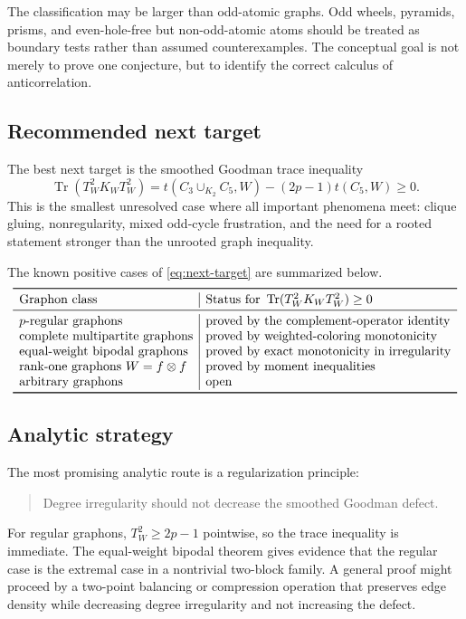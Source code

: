 \documentclass[11pt]{article}
\theoremstyle{definition}
\newcommand{\Tr}{\operatorname{Tr}}
\begin{document}
The classification may be larger than odd-atomic graphs.  Odd wheels, pyramids, prisms, and even-hole-free but non-odd-atomic atoms should be treated as boundary tests rather than assumed counterexamples.  The conceptual goal is not merely to prove one conjecture, but to identify the correct calculus of anticorrelation.

\subsection{Recommended next target}

The best next target is the smoothed Goodman trace inequality
\begin{equation}\label{eq:next-target}
  \Tr(T_W^2K_WT_W^2)
  =t(C_3\cup_{K_2}C_5,W)-(2p-1)t(C_5,W)
  \ge0.
\end{equation}
This is the smallest unresolved case where all important phenomena meet: clique gluing, nonregularity, mixed odd-cycle frustration, and the need for a rooted statement stronger than the unrooted graph inequality.

The known positive cases of \eqref{eq:next-target} are summarized below.
\[
\begin{array}{l|l}
\toprule
\text{Graphon class} & \text{Status for }\Tr(T_W^2K_WT_W^2)\ge0\\
\midrule
p\text{-regular graphons} & \text{proved by the complement-operator identity}\\
\text{complete multipartite graphons} & \text{proved by weighted-coloring monotonicity}\\
\text{equal-weight bipodal graphons} & \text{proved by exact monotonicity in irregularity}\\
\text{rank-one graphons }W=f\otimes f & \text{proved by moment inequalities}\\
\text{arbitrary graphons} & \text{open}\\
\bottomrule
\end{array}
\]

\subsection{Analytic strategy}

The most promising analytic route is a regularization principle:
\begin{quote}
Degree irregularity should not decrease the smoothed Goodman defect.
\end{quote}
For regular graphons, $T_W^2\ge2p-1$ pointwise, so the trace inequality is immediate.  The equal-weight bipodal theorem gives evidence that the regular case is the extremal case in a nontrivial two-block family.  A general proof might proceed by a two-point balancing or compression operation that preserves edge density while decreasing degree irregularity and not increasing the defect.
\end{document}
